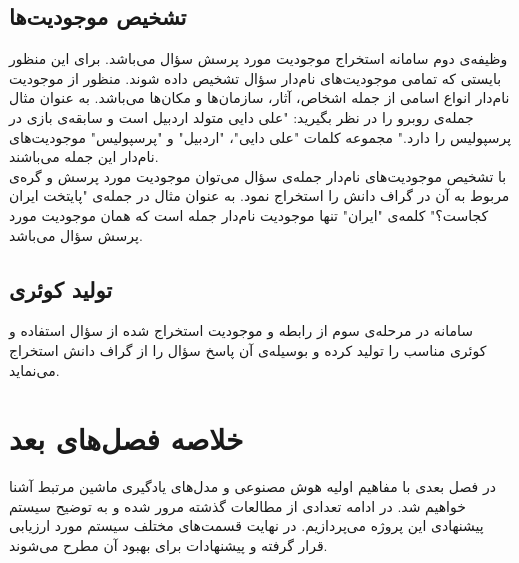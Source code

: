 \subsection{تشخیص موجودیت‌ها}
وظیفه‌ی دوم سامانه استخراج موجودیت مورد پرسش سؤال می‌باشد. برای این منظور بایستی که تمامی موجودیت‌های نام‌دار سؤال تشخیص داده شوند. منظور از موجودیت نام‌دار انواع اسامی از جمله اشخاص، آثار، سازمان‌ها و مکان‌ها می‌باشد. به عنوان مثال جمله‌ی روبرو را در نظر بگیرید:
"علی دایی متولد اردبیل است و سابقه‌ی بازی در پرسپولیس را دارد."
مجموعه کلمات "علی دایی"، "اردبیل" و "پرسپولیس" موجودیت‌های نام‌دار این جمله می‌باشند. \\
با تشخیص موجودیت‌های نام‌دار جمله‌ی سؤال می‌توان موجودیت مورد پرسش و گره‌ی مربوط به آن در گراف دانش را استخراج نمود. به عنوان مثال در جمله‌ی "پایتخت ایران کجاست؟" کلمه‌ی "ایران" تنها موجودیت نام‌دار جمله است که همان موجودیت مورد پرسش سؤال می‌باشد.

\subsection{تولید کوئری}
سامانه در مرحله‌ی سوم از رابطه‌ و موجودیت استخراج شده از سؤال استفاده و کوئری  مناسب را تولید کرده و بوسیله‌ی آن پاسخ سؤال را از گراف دانش استخراج می‌نماید.
\section{خلاصه فصل‌های بعد}
در فصل بعدی با مفاهیم اولیه هوش‌ مصنوعی و مدل‌های یادگیری ماشین مرتبط آشنا خواهیم شد. در ادامه تعدادی از مطالعات گذشته‌ مرور شده و به توضیح سیستم پیشنهادی این پروژه می‌پردازیم. در نهایت قسمت‌های مختلف سیستم مورد ارزیابی قرار گرفته و پیشنهادات برای بهبود آن مطرح می‌شوند.